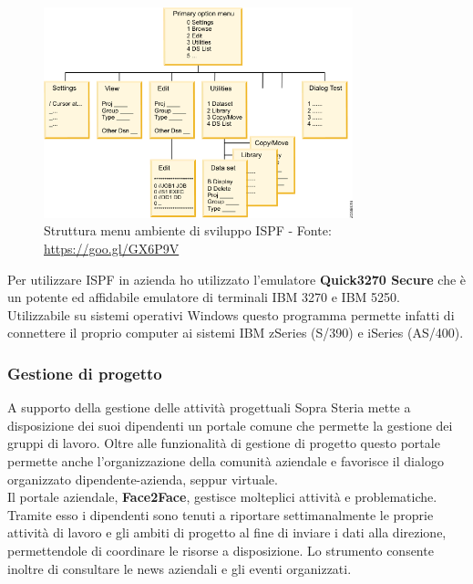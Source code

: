 	\begin{figure}[H]
		\centering
		\captionsetup{width=0.70\linewidth}
	   	\includegraphics[width=0.80\textwidth]{immagini/ISPF_menu_structure}
	   	\caption{Struttura menu ambiente di sviluppo ISPF - Fonte: \url{https://goo.gl/GX6P9V}}
	\end{figure}

	Per utilizzare ISPF in azienda ho utilizzato l'emulatore \textbf{Quick3270 Secure} che è un potente ed affidabile emulatore di terminali IBM 3270 e IBM 5250. Utilizzabile su sistemi operativi Windows questo programma permette infatti di connettere il proprio computer ai sistemi IBM zSeries (S/390) e iSeries (AS/400).

	\subsubsection{Gestione di progetto}

	A supporto della gestione delle attività progettuali Sopra Steria mette a disposizione dei suoi dipendenti un portale comune che permette la gestione dei gruppi di lavoro. Oltre alle funzionalità di gestione di progetto questo portale permette anche l'organizzazione della comunità aziendale e favorisce il dialogo organizzato dipendente-azienda, seppur virtuale.\\
	
	Il portale aziendale, \textbf{Face2Face}, gestisce molteplici attività e problematiche. Tramite esso i dipendenti sono tenuti a riportare settimanalmente le proprie attività di lavoro e gli ambiti di progetto al fine di inviare i dati alla direzione, permettendole di coordinare le risorse a disposizione. Lo strumento consente inoltre di consultare le news aziendali e gli eventi organizzati.

